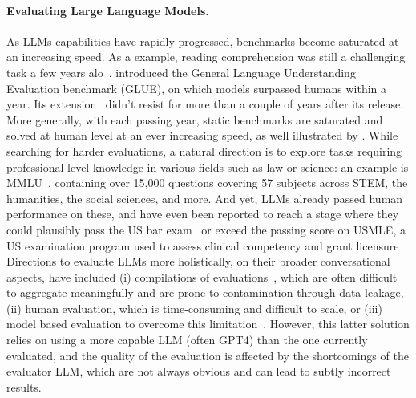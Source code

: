 \documentclass{fairmeta}
\begin{document}
\paragraph{Evaluating Large Language Models.} As LLMs capabilities have rapidly progressed, benchmarks become saturated at an increasing speed. As a example, reading comprehension was still a challenging task a few years alo~\citep{rajpurkar2016squad}. \citet{_wang-etal-2018-glue} introduced the General Language Understanding Evaluation benchmark (GLUE), on which models surpassed humans within a year. Its extension~\citep{_wang-etal-2019-superglue} didn't resist for more than a couple of years after its release. More generally, with each passing year, static benchmarks are saturated and solved at human level at an ever increasing speed, as well illustrated by \citet{_kiela-etal-2023-plottingprogress}.
While searching for harder evaluations, a natural direction is to explore tasks requiring professional level knowledge in various fields such as law or science: an example is MMLU~\citep{_hendrycks-etal-2021-measuring-mmlu}, containing over 15,000 questions covering 57 subjects across STEM, the humanities, the social sciences, and more. 
And yet, LLMs already passed human performance on these,
and have even been reported to reach a stage where they could plausibly pass the US bar exam~\citep{openai2023gpt4} or exceed the passing score on USMLE, a US examination program used to assess clinical competency and grant licensure~\citep{nori2023capabilities}.
Directions to evaluate LLMs more holistically, on their broader conversational aspects, have included (i) compilations of evaluations~\citep{_gao-etal-2021-harness,_liang-etal-2022-holistic,_srivastava-etal-2023-bigbench}, which are often difficult to aggregate meaningfully and are prone to contamination through data leakage, (ii) human evaluation, which is time-consuming and difficult to scale, or (iii) model based evaluation to overcome this limitation~\citep{zheng2023judging}. However, this latter solution relies on using a more capable LLM (often GPT4) than the one currently evaluated, and the quality of the evaluation is affected by the shortcomings of the evaluator LLM, which are not always obvious and can lead to subtly incorrect results.
\end{document}
